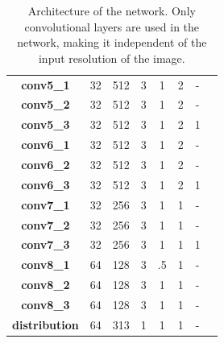 \documentclass{article}
\begin{document}
\begin{table}
\begin{tabular}{|c|c|c|c|c|c|c|c|}
        \textbf{conv5\_1}     & 32                  & 512               & 3                    & 1               & 2                   & -                      \\
        \textbf{conv5\_2}     & 32                  & 512               & 3                    & 1               & 2                   & -                      \\
        \textbf{conv5\_3}     & 32                  & 512               & 3                    & 1               & 2                   & 1                      \\ \hline
        \textbf{conv6\_1}     & 32                  & 512               & 3                    & 1               & 2                   & -                      \\
        \textbf{conv6\_2}     & 32                  & 512               & 3                    & 1               & 2                   & -                      \\
        \textbf{conv6\_3}     & 32                  & 512               & 3                    & 1               & 2                   & 1                      \\ \hline
        \textbf{conv7\_1}     & 32                  & 256               & 3                    & 1               & 1                   & -                      \\
        \textbf{conv7\_2}     & 32                  & 256               & 3                    & 1               & 1                   & -                      \\
        \textbf{conv7\_3}     & 32                  & 256               & 3                    & 1               & 1                   & 1                      \\ \hline
        \textbf{conv8\_1}     & 64                  & 128               & 3                    & .5              & 1                   & -                      \\
        \textbf{conv8\_2}     & 64                  & 128               & 3                    & 1               & 1                   & -                      \\
        \textbf{conv8\_3}     & 64                  & 128               & 3                    & 1               & 1                   & -                      \\
        \hline
        \textbf{distribution} & 64                  & 313               & 1                    & 1               & 1                   & -                      \\
        \hline
    \end{tabular}
    \caption{Architecture of the network. Only convolutional layers are used in the network, making it
        independent of the input resolution of the image.}
    \label{tab:network}
\end{table}
\end{document}
